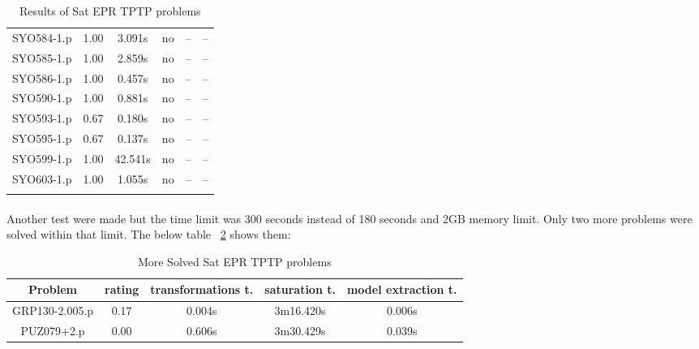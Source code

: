 \begin{center}
\begin{longtable}{||c | c | c | c | c | c||}
SYO584-1.p & 1.00 & 3.091s & no & -- & -- \\
SYO585-1.p & 1.00 & 2.859s & no & -- & -- \\
SYO586-1.p & 1.00 & 0.457s & no & -- & -- \\
SYO590-1.p & 1.00 & 0.881s & no & -- & -- \\
SYO593-1.p & 0.67 & 0.180s & no & -- & -- \\
SYO595-1.p & 0.67 & 0.137s & no & -- & -- \\
SYO599-1.p & 1.00 & 42.541s & no & -- & -- \\
SYO603-1.p & 1.00 & 1.055s & no & -- & -- \\
		\bottomrule
		\caption{Results of Sat EPR TPTP problems}
		\label{table:sat_epr_results}
		\end{longtable}
	\end{center}

\paragraph{}
Another test were made but the time limit was 300 seconds instead of 180 seconds and 2GB memory limit. Only two more problems were solved within that limit. The below table ~\ref{table:more_sat_epr_results} shows them:

\begin{table}[H]
	\centering
	\begin{tabular}{||c | c | c | c | c||} 
 		\toprule
		\cellcolor[HTML]{CCCCCC} Problem & \cellcolor[HTML]{CCCCCC} rating & \cellcolor[HTML]{CCCCCC} transformations t. & \cellcolor[HTML]{CCCCCC} saturation t. & \cellcolor[HTML]{CCCCCC} model extraction t. \\ %
		\midrule
		\midrule
GRP130-2.005.p & 0.17 & 0.004s & 3m16.420s & 0.006s \\
PUZ079+2.p & 0.00 & 0.606s & 3m30.429s & 0.039s \\
		\bottomrule
	\end{tabular}
	\caption{More Solved Sat EPR TPTP problems}
	\label{table:more_sat_epr_results}
\end{table}




\begin{comment}
\chapter{Forms of first order logic formulas}
Different forms of first order logic formulas.

\chapter{Algorithms}
Different Algorithms used.
\end{comment}